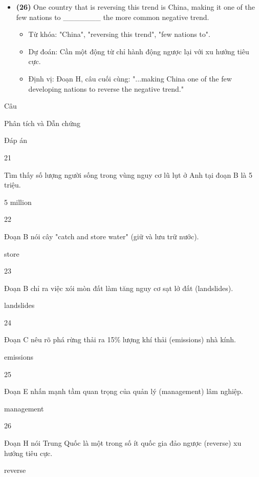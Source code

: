 \documentclass{../templateReading/cdreading}
\begin{document}
\begin{itemize}
\begin{itemize}
\item Từ khóa: "sustainable way", "good forestry", "important".
\item Dự đoán: Cần một danh từ ghép với "forestry".
\item Định vị: Đoạn E, câu đầu tiên: "Forestry management is important to make sure that stocks are not depleted..."
\end{itemize}
\item \textbf{(26)} One country that is reversing this trend is China, making it one of the few nations to \_\_\_\_\_\_\_ the more common negative trend.
\begin{itemize}
\item Từ khóa: "China", "reversing this trend", "few nations to".
\item Dự đoán: Cần một động từ chỉ hành động ngược lại với xu hướng tiêu cực.
\item Định vị: Đoạn H, câu cuối cùng: "...making China one of the few developing nations to reverse the negative trend."
\end{itemize}
\end{itemize}


Câu

Phân tích và Dẫn chứng

Đáp án

21

Tìm thấy số lượng người sống trong vùng nguy cơ lũ lụt ở Anh tại đoạn B là 5 triệu.

5 million

22

Đoạn B nói cây "catch and store water" (giữ và lưu trữ nước).

store

23

Đoạn B chỉ ra việc xói mòn đất làm tăng nguy cơ sạt lở đất (landslides).

landslides

24

Đoạn C nêu rõ phá rừng thải ra 15\% lượng khí thải (emissions) nhà kính.

emissions

25

Đoạn E nhấn mạnh tầm quan trọng của quản lý (management) lâm nghiệp.

management

26

Đoạn H nói Trung Quốc là một trong số ít quốc gia đảo ngược (reverse) xu hướng tiêu cực.

reverse
\end{document}
